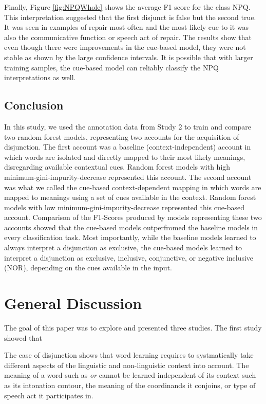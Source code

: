 \documentclass[,man,floatsintext]{apa6}
\begin{document}
Finally, Figure \ref{fig:NPQWhole} shows the average F1 score for the class NPQ. This interpretation suggested that the first disjunct is false but the second true. It was seen in examples of repair most often and the most likely cue to it was also the communicative function or speech act of repair. The results show that even though there were improvements in the cue-based model, they were not stable as shown by the large confidence intervals. It is possible that with larger training samples, the cue-based model can reliably classify the NPQ interpretations as well.

\hypertarget{conclusion-1}{%
\subsection{Conclusion}\label{conclusion-1}}

In this study, we used the annotation data from Study 2 to train and compare two random forest models, representing two accounts for the acquisition of disjunction. The first account was a baseline (context-independent) account in which words are isolated and directly mapped to their most likely meanings, disregarding available contextual cues. Random forest models with high minimum-gini-impurity-decrease represented this account. The second account was what we called the cue-based context-dependent mapping in which words are mapped to meanings using a set of cues available in the context. Random forest models with low minimum-gini-impurity-decrease represented this cue-based account. Comparison of the F1-Scores produced by models representing these two accounts showed that the cue-based models outperfromed the baseline models in every classification task. Most importantly, while the baseline models learned to always interpret a disjunction as exclusive, the cue-based models learned to interpret a disjunction as exclusive, inclusive, conjunctive, or negative inclusive (NOR), depending on the cues available in the input.

\hypertarget{general-discussion}{%
\section{General Discussion}\label{general-discussion}}

The goal of this paper was to explore and presented three studies. The first study showed that

The case of disjunction shows that word learning requires to systmatically take different aspects of the linguistic and non-linguistic context into account. The meaning of a word such as \emph{or} cannot be learned independent of its context such as its intonation contour, the meaning of the coordinands it conjoins, or type of speech act it participates in.
\end{document}
